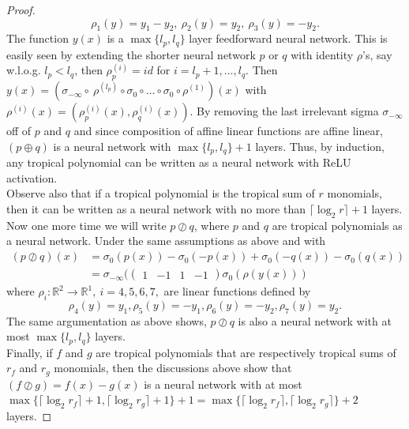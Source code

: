 \documentclass{article}
\theoremstyle{definition}
\begin{document}
\begin{proof}
$$\rho_{1}(y)=y_{1}-y_{2}, \ \rho_{2}(y)=y_{2}, \ \rho_{3}(y)= -y_{2}.$$
The function $y(x)$ is a $\max \{ l_{p}, l_{q} \}$ layer feedforward neural network. This is easily seen by extending the shorter neural network $p$ or $q$ with identity $\rho$'s, say w.l.o.g. $l_{p} < l_{q}$, then $\rho^{(i)}_{p} = id$ for $i = l_{p} + 1, \dots , l_{q}$. Then $y(x)=(\sigma_{- \infty} \circ \ \rho^{(l_{p})} \circ \sigma_{0} \circ \dots \circ \sigma_{0} \circ \rho^{(1)})(x)$ with $\rho^{(i)}(x) = (\rho_{p}^{(i)}(x), \rho_{q}^{(i)}(x))$.
By removing the last irrelevant sigma $\sigma_{- \infty}$ off of $p$ and $q$ and since composition of affine linear functions are affine linear, $(p\oplus q)$ is a neural network with $\max \{ l_{p}, l_{q} \} + 1$ layers. Thus, by induction, any tropical polynomial can be written as a neural network with ReLU activation. \\
Observe also that if a tropical polynomial is the tropical sum of $r$ monomials, then it can be written as a neural network with no more than
$\lceil \log_{2} r \rceil + 1$ layers. Now one more time we will write $p \oslash q$, where $p$ and $q$ are tropical polynomials as a neural network. Under the same assumptions as above and with
\begin{align*}
(p \oslash q)(x)
&= \sigma_{0}(p(x)) - \sigma_{0}(-p(x)) + \sigma_{0}(-q(x)) - \sigma_{0}(q(x)) \\
&= \sigma_{- \infty }(\begin{pmatrix} 1 & -1 & 1 & -1 \end{pmatrix} \sigma_{0}(\rho(y(x)))
\end{align*}
where $\rho_{i}:\mathbb{R}^{2} \to \mathbb{R}^{1}, \ i=4,5,6,7,$ are linear functions defined by
$$\rho_{4}(y)=y_{1}, \rho_{5}(y)=-y_{1}, \rho_{6}(y)=-y_{2}, \rho_{7}(y)=y_{2}.$$
The same argumentation as above shows, $p \oslash q$ is also a neural network with at most $\max \{ l_{p}, l_{q} \}$ layers. \\
Finally, if $f$ and $g$ are tropical polynomials that are respectively tropical sums of $r_{f}$ and $r_{g}$ monomials, then the discussions
above show that $(f \oslash g) = f(x) - g(x)$ is a neural network with at most $\max \{ \lceil \log_{2}r_{f} \rceil + 1, \lceil \log_{2}r_g \rceil + 1 \} + 1 = \max \{ \lceil \log_{2}r_{f} \rceil, \lceil \log_{2}r_g \rceil \} + 2$ layers.
\end{proof}
\end{document}
